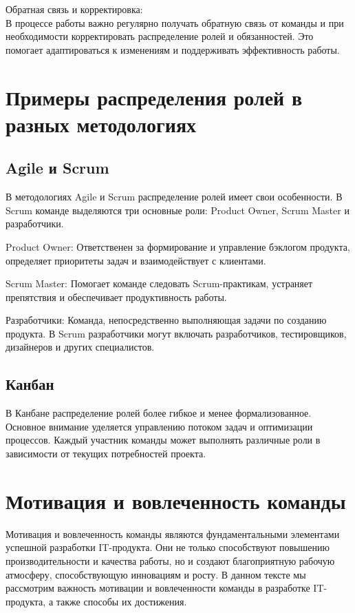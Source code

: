     Обратная связь и корректировка: \\
    В процессе работы важно регулярно получать обратную связь от команды и при необходимости корректировать распределение ролей и обязанностей. Это помогает адаптироваться к изменениям и поддерживать эффективность работы.

    \section{Примеры распределения ролей в разных методологиях}
    \subsection{Agile и Scrum}
    В методологиях Agile и Scrum распределение ролей имеет свои особенности. В Scrum команде выделяются три основные роли: Product Owner, Scrum Master и разработчики.
    
    Product Owner: Ответственен за формирование и управление бэклогом продукта, определяет приоритеты задач и взаимодействует с клиентами.

    Scrum Master: Помогает команде следовать Scrum-практикам, устраняет препятствия и обеспечивает продуктивность работы.

    Разработчики: Команда, непосредственно выполняющая задачи по созданию продукта. В Scrum разработчики могут включать разработчиков, тестировщиков, дизайнеров и других специалистов.

    \subsection{Канбан}
    В Канбане распределение ролей более гибкое и менее формализованное. Основное внимание уделяется управлению потоком задач и оптимизации процессов. Каждый участник команды может выполнять различные роли в зависимости от текущих потребностей проекта.

    \section{Мотивация и вовлеченность команды}
    Мотивация и вовлеченность команды являются фундаментальными элементами успешной разработки IT-продукта. Они не только способствуют повышению производительности и качества работы, но и создают благоприятную рабочую атмосферу, способствующую инновациям и росту. В данном тексте мы рассмотрим важность мотивации и вовлеченности команды в разработке IT-продукта, а также способы их достижения.

